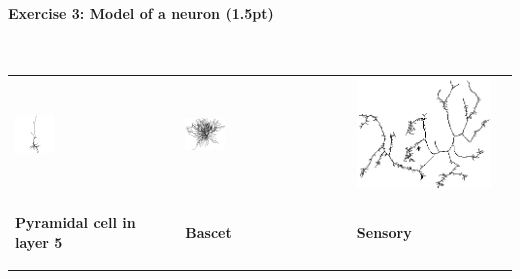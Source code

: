 \documentclass[a4paper,11pt]{article}
\newenvironment{exercise}[3]{\paragraph{Exercise #1: #2 (#3pt)}\ \\}{
\medskip}
\begin{document}
\begin{exercise}{3}{Model of a neuron}{1.5}
\begin{tabular}{p{3.7cm} p{3.7cm} p{3.7cm} p{3.7cm}}
\includegraphics[width=0.25\textwidth]{pyramidal5.png} &
\includegraphics[width=0.25\textwidth]{bascet.png} &
\includegraphics[height=0.25\textwidth]{sensory.png} &
 \\

\begin{center}\textbf{Pyramidal cell in layer 5}\end{center}&
\begin{center}\textbf{Bascet}\end{center}&
\begin{center}\textbf{Sensory}\end{center}&
\begin{center}\textbf{}\end{center} \\
\end{tabular}



\end{exercise}
\end{document}
